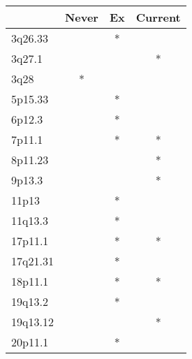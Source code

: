 \begin{tabular}{lccc}
\toprule
{} & Never & Ex & Current \\
\midrule
3q26.33  &       &  * &         \\
3q27.1   &       &    &       * \\
3q28     &     * &    &         \\
5p15.33  &       &  * &         \\
6p12.3   &       &  * &         \\
7p11.1   &       &  * &       * \\
8p11.23  &       &    &       * \\
9p13.3   &       &    &       * \\
11p13    &       &  * &         \\
11q13.3  &       &  * &         \\
17p11.1  &       &  * &       * \\
17q21.31 &       &  * &         \\
18p11.1  &       &  * &       * \\
19q13.2  &       &  * &         \\
19q13.12 &       &    &       * \\
20p11.1  &       &  * &         \\
\bottomrule
\end{tabular}
